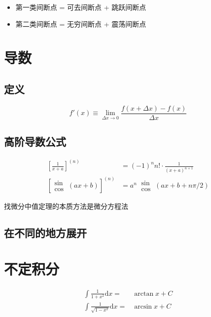 \documentclass{ctexart}
\begin{document}
\begin{itemize}
    \item 第一类间断点 = 可去间断点 + 跳跃间断点
    \item 第二类间断点 = 无穷间断点 + 震荡间断点
\end{itemize}

\section{导数}

\subsection{定义}

\begin{equation}
    f'(x) \equiv \lim_{\Delta x \to 0} \frac{f(x + \Delta x) - f(x)}{\Delta x}
\end{equation}

\subsection{高阶导数公式}

\begin{align}
    \left[\frac{1}{x + a}\right]^{(n)}     & = (-1)^n n! \cdot \frac{1}{(x + a)^{n+1}}           \\
    \left[\begin{aligned}
                  \sin \\ \cos
              \end{aligned} \ (a x + b)\right]^{(n)} & = a^n \ \begin{aligned}
                                                               \sin \\ \cos
                                                           \end{aligned} \ (a x + b + n \pi / 2)
\end{align}

找微分中值定理的本质方法是微分方程法

\subsection{在不同的地方展开}

\section{不定积分}

\begin{align}
    \int \frac{1}{1 + x^2} \mathrm{d}x =        & \arctan x + C \\
    \int \frac{1}{\sqrt{1 - x^2}} \mathrm{d}x = & \arcsin x + C
\end{align}
\end{document}
